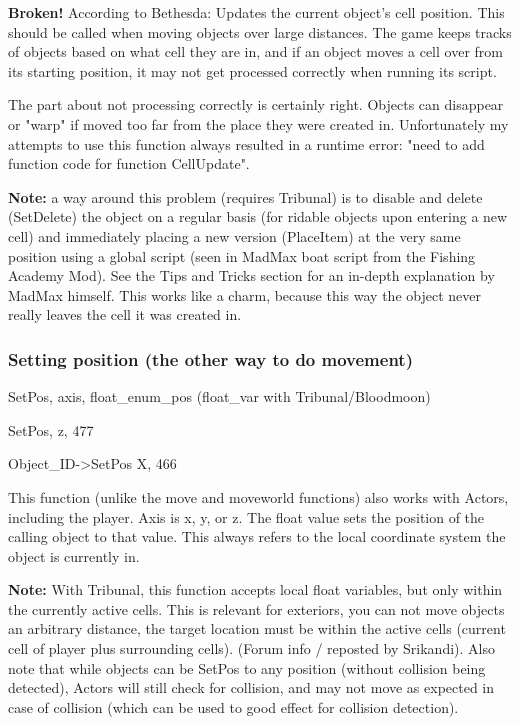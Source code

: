 \documentclass[
]{article}
\begin{document}
\textbf{Broken!} According to Bethesda: Updates the current object's
cell position. This should be called when moving objects over large
distances. The game keeps tracks of objects based on what cell they are
in, and if an object moves a cell over from its starting position, it
may not get processed correctly when running its script.

The part about not processing correctly is certainly right. Objects can
disappear or "warp" if moved too far from the place they were created
in. Unfortunately my attempts to use this function always resulted in a
runtime error: "need to add function code for function CellUpdate".

\textbf{Note:} a way around this problem (requires Tribunal) is to
disable and delete (SetDelete) the object on a regular basis (for
ridable objects upon entering a new cell) and immediately placing a new
version (PlaceItem) at the very same position using a global script
(seen in MadMax boat script from the Fishing Academy Mod). See the Tips
and Tricks section for an in-depth explanation by MadMax himself. This
works like a charm, because this way the object never really leaves the
cell it was created in.

\hypertarget{setting-position-the-other-way-to-do-movement}{%
\subsubsection{Setting position (the other way to do
movement)}\label{setting-position-the-other-way-to-do-movement}}

SetPos, axis, float\_enum\_pos (float\_var with Tribunal/Bloodmoon)

SetPos, z, 477

Object\_ID-\textgreater SetPos X, 466

This function (unlike the move and moveworld functions) also works with
Actors, including the player. Axis is x, y, or z. The float value sets
the position of the calling object to that value. This always refers to
the local coordinate system the object is currently in.

\textbf{Note:} With Tribunal, this function accepts local float
variables, but only within the currently active cells. This is relevant
for exteriors, you can not move objects an arbitrary distance, the
target location must be within the active cells (current cell of player
plus surrounding cells). (Forum info / reposted by Srikandi). Also note
that while objects can be SetPos to any position (without collision
being detected), Actors will still check for collision, and may not move
as expected in case of collision (which can be used to good effect for
collision detection).
\end{document}
